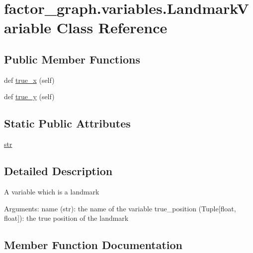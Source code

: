 \hypertarget{classfactor__graph_1_1variables_1_1LandmarkVariable}{}\section{factor\+\_\+graph.\+variables.\+Landmark\+Variable Class Reference}
\label{classfactor__graph_1_1variables_1_1LandmarkVariable}
\subsection*{Public Member Functions}
\begin{DoxyCompactItemize}
\item
def \hyperlink{classfactor__graph_1_1variables_1_1LandmarkVariable_ad83d74f96f1c5aa63c5896414cac95f9}{true\+\_\+x} (self)
\item
def \hyperlink{classfactor__graph_1_1variables_1_1LandmarkVariable_ab7b92a5f21b170bad1596221c0d4963b}{true\+\_\+y} (self)
\end{DoxyCompactItemize}
\subsection*{Static Public Attributes}
\begin{DoxyCompactItemize}
\item
\hyperlink{classfactor__graph_1_1variables_1_1LandmarkVariable_a982a1d08012cc054cb9fe08e7f6f7907}{str}
\end{DoxyCompactItemize}


\subsection{Detailed Description}
\begin{DoxyVerb}A variable which is a landmark

Arguments:
    name (str): the name of the variable
    true_position (Tuple[float, float]): the true position of the landmark
\end{DoxyVerb}


\subsection{Member Function Documentation}
\mbox{\label{classfactor__graph_1_1variables_1_1LandmarkVariable_ad83d74f96f1c5aa63c5896414cac95f9}}
